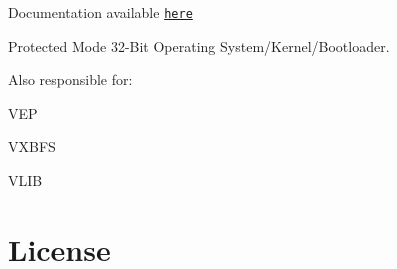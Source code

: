 \href{https://app.fossa.com/projects/git%2Bgithub.com%2Fryelow90210%2FVitalityX?ref=badge_shield}{\tt }  

Documentation available \href{https://psychosisinteractive.github.io/vitalityx/html}{\tt here}

Protected Mode 32-\/\+Bit Operating System/\+Kernel/\+Bootloader.

Also responsible for\+:
\begin{DoxyEnumerate}
\item V\+EP
\item V\+X\+B\+FS
\item V\+L\+IB
\end{DoxyEnumerate}\hypertarget{a00358_autotoc_md15}{}\section{License}\label{a00358_autotoc_md15}
\href{https://app.fossa.com/projects/git%2Bgithub.com%2Fryelow90210%2FVitalityX?ref=badge_large}{\tt }

